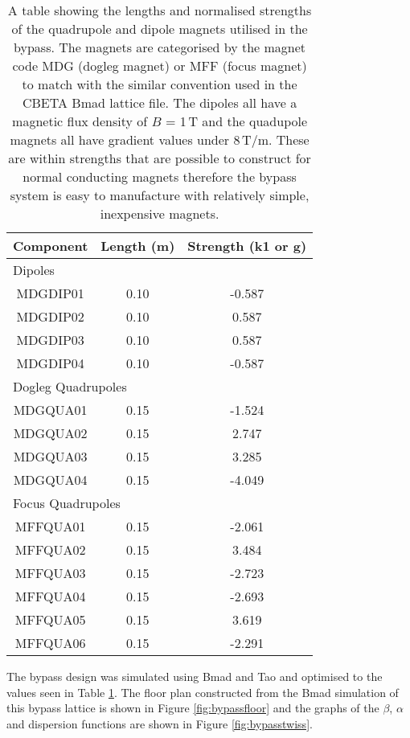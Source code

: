 \documentclass[11pt]{article}
\begin{document}
\begin{table}[H]
\centering
\begin{tabular}{|c||c|c|}
\hline
\textbf{Component} & \textbf{Length (m)} & \textbf{Strength (k1 or g)} \\
\hline
\multicolumn{3}{|l|}{Dipoles} \\
\hline
MDGDIP01 & 0.10 & -0.587 \\
\hline
MDGDIP02 & 0.10 & 0.587 \\
\hline
MDGDIP03 & 0.10 & 0.587 \\
\hline
MDGDIP04 & 0.10 & -0.587 \\
\hline
\multicolumn{3}{|l|}{Dogleg Quadrupoles} \\
\hline
MDGQUA01 & 0.15 & -1.524 \\
\hline
MDGQUA02 & 0.15 & 2.747 \\
\hline
MDGQUA03 & 0.15 & 3.285 \\
\hline
MDGQUA04 & 0.15 & -4.049 \\
\hline
\multicolumn{3}{|l|}{Focus Quadrupoles} \\
\hline
MFFQUA01 & 0.15 & -2.061 \\
\hline
MFFQUA02 & 0.15 & 3.484 \\
\hline 
MFFQUA03 & 0.15 & -2.723 \\
\hline
MFFQUA04 & 0.15 & -2.693 \\
\hline
MFFQUA05 & 0.15 & 3.619 \\
\hline
MFFQUA06 & 0.15 & -2.291 \\
\hline
\end{tabular} 
\caption{\label{tab:bypassmag} A table showing the lengths and normalised strengths of the quadrupole and dipole magnets utilised in the bypass. The magnets are categorised by the magnet code MDG (dogleg magnet) or MFF (focus magnet) to match with the similar convention used in the CBETA Bmad lattice file. The dipoles all have a magnetic flux density of $B$ = 1\,T and the quadupole magnets all have gradient values under 8\,T/m. These are within strengths that are possible to construct for normal conducting magnets therefore the bypass system is easy to manufacture with relatively simple, inexpensive magnets. }
\end{table}

The bypass design was simulated using Bmad \cite{Bmad} and Tao \cite{Tao} and optimised to the values seen in Table \ref{tab:bypassmag}. The floor plan constructed from the Bmad simulation of this bypass lattice is shown in Figure \ref{fig:bypassfloor} and the graphs of the $\beta$, $\alpha$ and dispersion functions are shown in Figure \ref{fig:bypasstwiss}.
\end{document}
